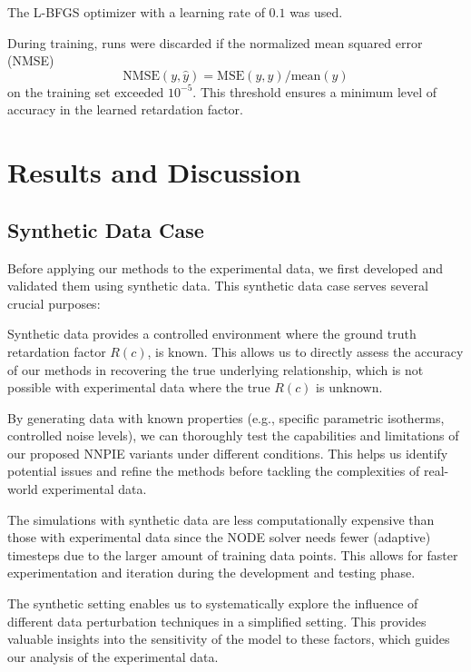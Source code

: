 The L-BFGS optimizer \cite{malouf2002comparison} with a learning rate of $0.1$ was used.

During training, runs were discarded if the normalized mean squared error (NMSE)
\begin{equation*}
    \text{NMSE}(y, \hat{y}) = \text{MSE}(y, \hat{y}) / \text{mean}(y)
\end{equation*}
on the training set exceeded $10^{-5}$. This threshold ensures a minimum level of accuracy in the learned retardation factor.



\chapter{Results and Discussion}
\label{sec:results_and_discussion}

\section{Synthetic Data Case}
Before applying our methods to the experimental data, we first developed and validated them using synthetic data. This synthetic data case serves several crucial purposes:
\begin{enumerate*}
    \item Synthetic data provides a controlled environment where the ground truth retardation factor $R(c)$, is known. This allows us to directly assess the accuracy of our methods in recovering the true underlying relationship, which is not possible with experimental data where the true $R(c)$ is unknown.
    \item By generating data with known properties (e.g., specific parametric isotherms, controlled noise levels), we can thoroughly test the capabilities and limitations of our proposed NNPIE variants under different conditions. This helps us identify potential issues and refine the methods before tackling the complexities of real-world experimental data.
    \item The simulations with synthetic data are less computationally expensive than those with experimental data since the NODE solver needs fewer (adaptive) timesteps due to the larger amount of training data points. This allows for faster experimentation and iteration during the development and testing phase.
    \item The synthetic setting enables us to systematically explore the influence of different data perturbation techniques in a simplified setting. This provides valuable insights into the sensitivity of the model to these factors, which guides our analysis of the experimental data.
\end{enumerate*}

